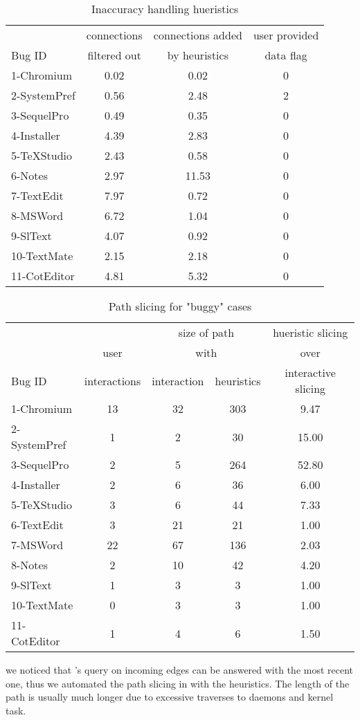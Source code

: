 
\begin{table}[ht]
\footnotesize
\centering
  \begin{tabularx}{\columnwidth}{l|ccc}
       & connections & connections added  & user provided \\
Bug ID & filtered out & by heuristics & data flag \\
\hline
\hline
1-Chromium & 0.02 & 0.02 & 0 \\
2-SystemPref & 0.56 & 2.48 & 2 \\
3-SequelPro & 0.49 & 0.35 & 0 \\
4-Installer & 4.39 & 2.83 & 0 \\
5-TeXStudio & 2.43 & 0.58 & 0 \\
6-Notes & 2.97 & 11.53 & 0 \\
7-TextEdit & 7.97 & 0.72 & 0 \\
8-MSWord & 6.72 & 1.04 & 0 \\
9-SlText & 4.07 & 0.92 & 0 \\
10-TextMate & 2.15 & 2.18 & 0 \\
11-CotEditor & 4.81 & 5.32 & 0 \\
\hline
  \end{tabularx}

  \parbox{\columnwidth}
  {\caption{Inaccuracy handling hueristics} 
  	{}
  \label{table:statistics}
  }
\end{table}


\begin{table}[ht]
\footnotesize
\centering
  \begin{tabularx}{\columnwidth}{l|cccc}
 	   &       &\multicolumn{2}{c}{size of path}& hueristic slicing\\
       & user  & \multicolumn{2}{c}{with}  & over \\
Bug ID & interactions & interaction & heuristics  &  interactive slicing\\
\hline
\hline
1-Chromium  & 13 & 32 & 303 & 9.47\\
2-SystemPref & 1 & 2 & 30 & 15.00\\
3-SequelPro  & 2 & 5 & 264 & 52.80\\
4-Installer  & 2 & 6 & 36  & 6.00\\
5-TeXStudio  & 3 & 6 & 44  & 7.33\\
6-TextEdit  & 3 & 21 & 21 & 1.00\\
7-MSWord  & 22 & 67 & 136 & 2.03\\
8-Notes  & 2 & 10 & 42 & 4.20\\
9-SlText  & 1 & 3 & 3 & 1.00\\
10-TextMate  & 0 & 3 & 3 & 1.00\\
11-CotEditor  & 1 & 4 & 6 & 1.50\\
\hline
  \end{tabularx}
  \parbox{\columnwidth}
  {\caption{Path slicing for "buggy" cases} 
	{
	we noticed that \xxx's query on incoming edges can be answered with the most
	recent one, thus we automated the path slicing in \xxx with the heuristics.
	The length of the path is usually much longer due to excessive traverses to
	daemons and kernel task.
    }
  \label{table:results}
  }
\end{table}
